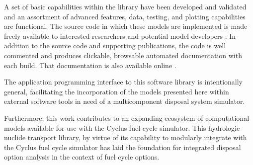 A set of basic capabilities within the \Cyder library have been developed and
validated and an assortment of advanced features, data, testing, and plotting
capabilities are functional. The \Cyder source code in which these models are
implemented is made freely available to interested researchers and potential
model developers \cite{huff_cyder_2013}. In addition to the source code and
supporting publications, the \Cyder code is well commented and produces
clickable, browsable automated documentation with each build. That
documentation is also available online \cite{huff_cyder_2013}.

The application programming interface to this software library is intentionally
general, facilitating the incorporation of the models presented here within
external software tools in need of a multicomponent disposal system simulator.  

Furthermore, this work contributes to an expanding ecosystem of computational
models available for use with the Cyclus fuel cycle simulator. This hydrologic
nuclide transport library, by virtue of its capability to modularly integrate
with the Cyclus fuel cycle simulator has laid the foundation for integrated
disposal option analysis in the context of fuel cycle options.
